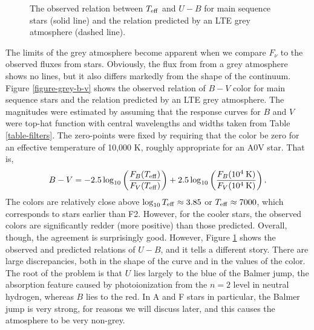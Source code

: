 \begin{figure}
\footnotesize
{}
\caption{The observed relation between $T_\mathrm{eff}$ and $U-B$ for
main sequence stars (solid line) and the relation
predicted by an LTE grey atmosphere (dashed line).}
\label{figure-grey-u-b}
\end{figure}

The limits of the grey atmosphere become apparent when we compare
$F_\nu$ to the observed fluxes from stars. Obviously, the flux from from
a grey atmosphere shows no lines, but it also differs markedly from the
shape of the continuum. Figure \ref{figure-grey-b-v} shows the observed
relation of $B-V$ color for main sequence stars and the relation
predicted by an LTE grey atmosphere. The magnitudes were estimated by
assuming that the response curves for $B$ and $V$ were top-hat function
with central wavelengths and widths taken from Table
\ref{table-filters}. The zero-points were fixed by requiring that the
color be zero for an effective temperature of 10,000 K, roughly
appropriate for an A0V star. That is,
\begin{align}
B-V =
-2.5 \log_{10}\left(\frac{F_B(T_\mathrm{eff})}{ F_V(T_\mathrm{eff})}\right)
+ 2.5 \log_{10}\left(\frac{F_B(10^4\:\mathrm{K})}{F_V(10^4\:\mathrm{K})}\right).
\end{align}
The colors are relatively close above $\log_{10} T_\mathrm{eff}
\approx 3.85$ or $T_\mathrm{eff} \approx 7000$, which corresponds to
stars earlier than F2. However, for the cooler stars, the observed
colors are significantly redder (more positive) than those predicted.
Overall, though, the agreement is surprisingly good. However, Figure
\ref{figure-grey-u-b} shows the observed and predicted relations of
$U-B$, and it tells a different story. There are large discrepancies,
both in the shape of the curve and in the values of the color. The root
of the problem is that $U$ lies largely to the blue of the Balmer jump,
the absorption feature caused by photoionization from the $n=2$ level in
neutral hydrogen, whereas $B$ lies to the red. In A and F stars in
particular, the Balmer jump is very strong, for reasons we will discuss
later, and this causes the atmosphere to be very non-grey.

